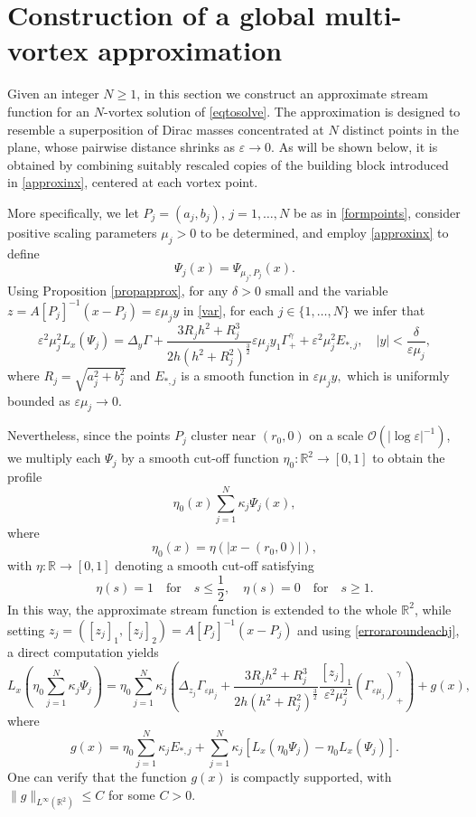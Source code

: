\documentclass[11pt,reqno,a4paper]{amsart}
\numberwithin{equation}{section}
\newcommand{\R}{\mathbb{R}}
\newcommand{\ve}{\varepsilon}
\begin{document}
\section{Construction of a global multi-vortex approximation}\label{section3}
Given an integer $N\geq 1$, in this section we construct an approximate stream function for an $N$-vortex solution of \eqref{eqtosolve}. The approximation is designed to resemble a superposition of Dirac masses concentrated at $N$ distinct points in the plane, whose pairwise distance shrinks as $\ve\to 0.$ As will be shown below, it is obtained by combining suitably rescaled copies of the building block introduced in \eqref{approxinx}, centered at each vortex point. 

More specifically, we let $P_j=(a_j,b_j),\,j=1,\dots,N$ be as in 
\eqref{formpoints}, consider positive scaling parameters $\mu_j>0$ to be determined, and employ \eqref{approxinx} to define
\begin{equation}\label{profj}
\Psi_j(x)=\Psi_{\mu_j,P_j}(x).
\end{equation}
 Using Proposition \ref{propapprox}, for any $\delta>0$ small and the variable $z=A[P_j]^{-1}(x-P_j)=\ve\mu_j y$  in \eqref{var}, for each $j\in\{1,\dots,N\}$ we infer that
\begin{equation}\label{erroraroundeachj}
\ve^2\mu_j^2L_{x}(\Psi_j)=\Delta_{y}\Gamma +\frac{3R_jh^2+R_j^3}{2h(h^2+R_j^2)^{\frac 3 2}}\ve \mu_j y_1 \Gamma^{\gamma}_{+} +\ve^2\mu_j^2 E_{*,j}, \quad |y|<\frac{\delta}{\ve\mu_j},
\end{equation}
where $R_j=\sqrt{a_j^2+b_j^2}$ and $E_{*,j}$ is a smooth function in $\ve\mu_j y,$ which is uniformly bounded as $\ve\mu_j \to 0.$ 

Nevertheless, since the points $P_j$ cluster near $(r_0,0)$ on a scale $\mathcal{O}(|\log\ve|^{-1})$, we multiply each $\Psi_j$ by a smooth cut-off function $\eta_0:\R^2\to[0,1]$ 
to obtain the profile
\[\eta_{0}(x)\sum_{j=1}^{N}\kappa_j\Psi_j(x),\] 
where 
\begin{equation*}
    \eta_{0}(x)=\eta\left(|x-(r_0,0)|\right),
\end{equation*}
with $\eta:\R\to [0,1]$ denoting a smooth cut-off satisfying 
\begin{equation}\label{defeta}
\eta(s)=1 \quad \mbox{for} \quad s\leq \frac 1 2, \quad \eta(s)=0 \quad \mbox{for}\quad s \geq 1.
\end{equation}
In this way, the approximate stream function is extended to the whole $\R^2$, while setting $z_j=([z_j]_1,[z_j]_2)=A[P_j]^{-1}(x-P_j)$ and using \eqref{erroraroundeachj}, a direct computation yields 
\[L_{x}\left(\eta_0\sum_{j=1}^{N}\kappa_j\Psi_j\right)=\eta_{0}\sum_{j=1}^{N}\kappa_j\left(\Delta_{z_j}\Gamma_{\ve\mu_j}+\frac{3R_j h^2+R_j^3}{2h(h^2+R_j^2)^{\frac 3 2}}\frac{[z_j]_1}{\ve^2\mu_j^2}(\Gamma_{\ve\mu_j})^{\gamma}_{+}\right) +g(x),
\]
where 
\[g(x)=\eta_{0}\sum_{j=1}^{N}\kappa_j E_{*,j}+\sum_{j=1}^{N}\kappa_j\left[L_{x}\left(\eta_{0}\Psi_j\right)-\eta_{0}L_{x}\left(\Psi_j\right)\right].
\]
One can verify that the function $g(x)$ is compactly supported, with  $\|g\|_{L^{\infty}\left(\R^2\right)} \leq C$ for some $C>0.$ 
\end{document}
